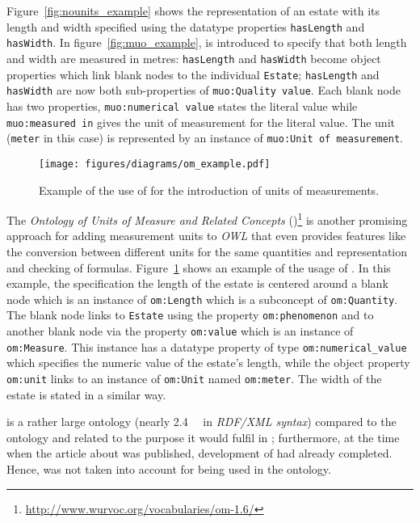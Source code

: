Figure~\ref{fig:nounits_example} shows the representation of an estate with its length and width specified using the datatype properties \texttt{hasLength} and \texttt{hasWidth}. In figure~\ref{fig:muo_example}, \muo is introduced to specify that both length and width are measured in metres: \texttt{hasLength} and \texttt{hasWidth} become object properties which link blank nodes to the individual \texttt{Estate}; \texttt{hasLength} and \texttt{hasWidth} are now both sub-properties of \texttt{muo:Quality value}. Each blank node has two properties, \texttt{muo:numerical value} states the literal value while \texttt{muo:measured in} gives the unit of measurement for the literal value. The unit (\texttt{meter} in this case) is represented by an instance of \texttt{muo:Unit of measurement}.

\begin{figure}
\centering
\texttt{[image: figures/diagrams/om\_example.pdf]}
\caption{Example of the use of  for the introduction of units of measurements.}
\label{fig:om_example}
\end{figure}

The \emph{Ontology of Units of Measure and Related Concepts} ()\footnote{\href{http://www.wurvoc.org/vocabularies/om-1.6/}{http://www.wurvoc.org/vocabularies/om-1.6/}}\cite{OM} is another promising approach for adding measurement units to \emph{OWL} that even provides features like the conversion between different units for the same quantities and representation and checking of formulas. Figure~\ref{fig:om_example} shows an example of the usage of . In this example, the specification the length of the estate is centered around a blank node which is an instance of \texttt{om:Length} which is a subconcept of \texttt{om:Quantity}. The blank node links to \texttt{Estate} using the property \texttt{om:phenomenon} and to another blank node via the property \texttt{om:value} which is an instance of \texttt{om:Measure}. This instance has a datatype property of type \texttt{om:numerical\_value} which specifies the numeric value of the estate's length, while the object property \texttt{om:unit}
links to an instance of \texttt{om:Unit} named \texttt{om:meter}. The width of the estate is stated in a similar way.

 is a rather large ontology (nearly \SI{2.4}{\mebi\byte} in \emph{RDF/XML syntax}) compared to the \thinkhomeweather ontology and related to the purpose it would fulfil in \thinkhomeweather; furthermore, at the time when the article about  was published, development of \thinkhomeweather had already completed. Hence,  was not taken into account for being used in the \thinkhomeweather ontology.


